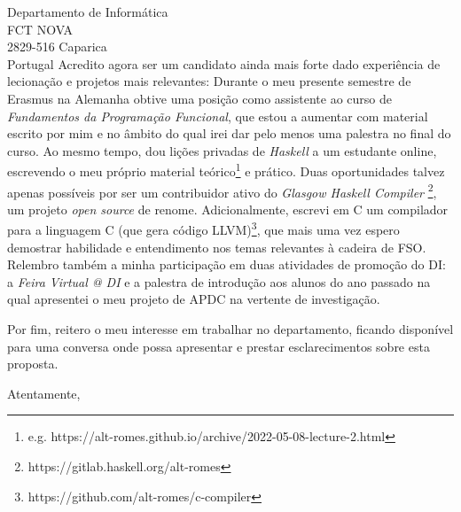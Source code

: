 \documentclass[11pt]{letter} %
\begin{document}
\begin{letter}{Departamento de Informática\\
FCT NOVA\\
2829-516 Caparica\\
Portugal}
Acredito agora ser um candidato ainda mais forte dado experiência de lecionação
    e projetos mais relevantes: Durante o meu presente semestre de Erasmus na
    Alemanha obtive uma posição como assistente ao curso de \emph{Fundamentos da
    Programação Funcional}, que estou a aumentar com material escrito por mim e
    no âmbito do qual irei dar pelo menos uma palestra no final do curso. Ao
    mesmo tempo, dou lições privadas de \emph{Haskell} a um estudante online,
    escrevendo o meu próprio material teórico\footnote{e.g.
    https://alt-romes.github.io/archive/2022-05-08-lecture-2.html} e prático.
    Duas oportunidades talvez apenas possíveis por ser um contribuidor ativo do
    \emph{Glasgow Haskell Compiler}
    \footnote{https://gitlab.haskell.org/alt-romes}, um projeto \emph{open
    source} de renome. Adicionalmente, escrevi em C um compilador para a
    linguagem C (que gera código
    LLVM)\footnote{https://github.com/alt-romes/c-compiler}, que mais uma vez
    espero demostrar habilidade e entendimento nos temas relevantes à cadeira de
    FSO.  Relembro também a minha participação em duas atividades de promoção do
    DI: a \emph{Feira Virtual @ DI} e a palestra de introdução aos alunos do ano
    passado na qual apresentei o meu projeto de APDC na vertente de
    investigação.
 
Por fim, reitero o meu interesse em trabalhar no departamento, ficando
    disponível para uma conversa onde possa apresentar e prestar esclarecimentos
    sobre esta proposta.

\closing{Atentamente,}




\end{letter}
\end{document}
